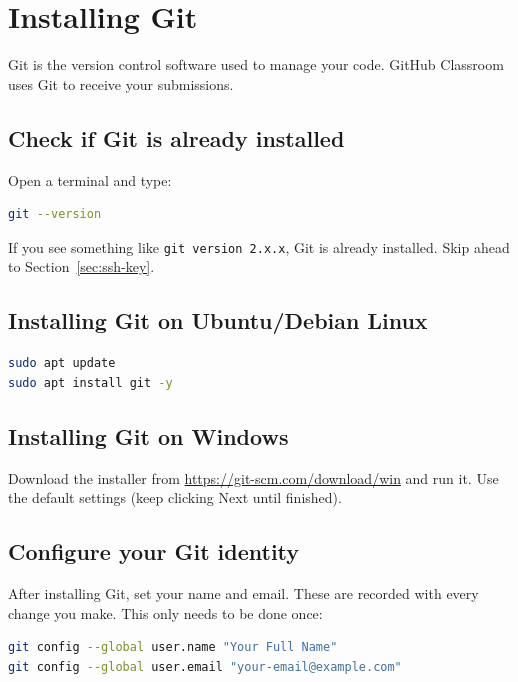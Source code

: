 \documentclass[
    a4paper,
    11pt,
    parskip=half
]{scrartcl}
\begin{document}
\section{Installing Git}
\label{sec:install-git}

Git is the version control software used to manage your code. GitHub Classroom uses Git to receive your submissions.

\subsection*{Check if Git is already installed}

Open a terminal and type:

\begin{lstlisting}[language=bash]
git --version
\end{lstlisting}

If you see something like \texttt{git version 2.x.x}, Git is already installed. Skip ahead to Section~\ref{sec:ssh-key}.

\subsection*{Installing Git on Ubuntu/Debian Linux}

\begin{lstlisting}[language=bash]
sudo apt update
sudo apt install git -y
\end{lstlisting}

\subsection*{Installing Git on Windows}

Download the installer from \url{https://git-scm.com/download/win} and run it. Use the default settings (keep clicking Next until finished).

\subsection*{Configure your Git identity}

After installing Git, set your name and email. These are recorded with every change you make. This only needs to be done once:

\begin{lstlisting}[language=bash]
git config --global user.name "Your Full Name"
git config --global user.email "your-email@example.com"
\end{lstlisting}
\end{document}
